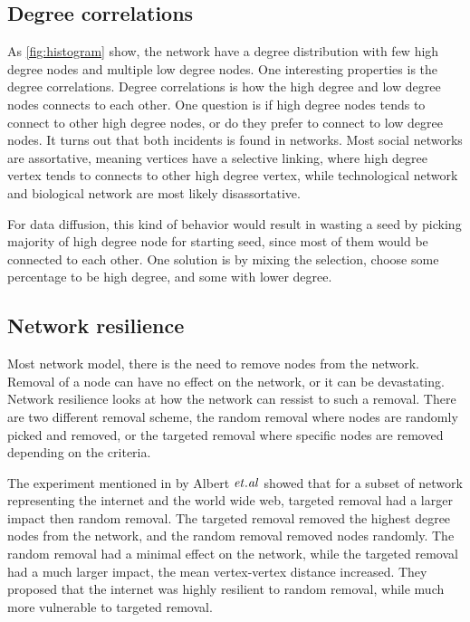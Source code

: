 \subsection{Degree correlations}
As \ref{fig:histogram} show, the network have a degree distribution with few high degree nodes and multiple low degree nodes. One interesting properties is the degree correlations. Degree correlations is how the high degree and low degree nodes connects to each other. One question is if high degree nodes tends to connect to other high degree nodes, or do they prefer to connect to low degree nodes. It turns out that both incidents is found in networks\cite{complexNetwork}. Most social networks are assortative, meaning vertices have a selective linking, where high degree vertex tends to connects to other high degree vertex, while technological network and biological network are most likely disassortative\cite{AssortativeMixing2002}. 

For data diffusion, this kind of behavior would result in wasting a seed by picking majority of high degree node for starting seed, since most of them would be connected to each other. One solution is by mixing the selection, choose some percentage to be high degree, and some with lower degree.


\subsection{Network resilience}
Most network model, there is the need to remove nodes from the network. Removal of a node can have no effect on the network, or it can be devastating. Network resilience looks at how the network can ressist to such a removal. There are two different removal scheme, the random removal where nodes are randomly picked and removed, or the targeted removal where specific nodes are removed depending on the criteria. 

The experiment mentioned in \cite{complexNetwork} by Albert $\it{et. al}$ showed that for a subset of network representing the internet and the world wide web, targeted removal had a larger impact then random removal. The targeted removal removed the highest degree nodes from the network, and the random removal removed nodes randomly. The random removal had a minimal effect on the network, while the targeted removal had a much larger impact, the mean vertex-vertex distance increased. They proposed that the internet was highly resilient to random removal, while much more vulnerable to targeted removal. 

